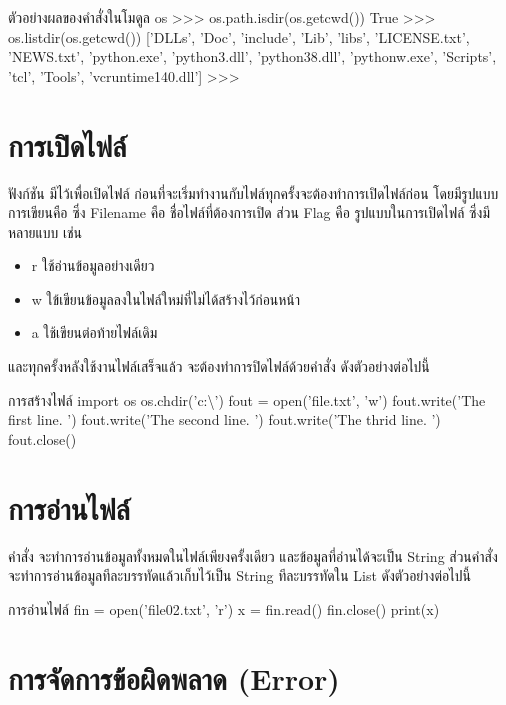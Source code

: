 \begin{codelist}{ตัวอย่างผลของคำสั่งในโมดูล os}{}
>>> os.path.isdir(os.getcwd())
True
>>> os.listdir(os.getcwd())
['DLLs', 'Doc', 'include', 'Lib', 'libs', 'LICENSE.txt', 'NEWS.txt', 
'python.exe', 'python3.dll', 'python38.dll', 'pythonw.exe', 
'Scripts', 'tcl', 'Tools', 'vcruntime140.dll']
>>>
\end{codelist}


\section{การเปิดไฟล์}

ฟังก์ชัน  มีไว้เพื่อเปิดไฟล์ ก่อนที่จะเริ่มทำงานกับไฟล์ทุกครั้งจะต้องทำการเปิดไฟล์ก่อน โดยมีรูปแบบการเขียนคือ  ซึ่ง Filename คือ ชื่อไฟล์ที่ต้องการเปิด ส่วน Flag คือ รูปแบบในการเปิดไฟล์ ซึ่งมีหลายแบบ เช่น 
\begin{itemize} 
\item 	r ใช้อ่านข้อมูลอย่างเดียว 
\item 	w ใข้เขียนข้อมูลลงในไฟล์ใหม่ที่ไม่ได้สร้างไว้ก่อนหน้า 
\item 	a ใช้เขียนต่อท้ายไฟล์เดิม 
\end{itemize}
และทุกครั้งหลังใช้งานไฟล์เสร็จแล้ว จะต้องทำการปิดไฟล์ด้วยคำสั่ง  ดังตัวอย่างต่อไปนี้

\begin{codelist}{การสร้างไฟล์}{}
import os
os.chdir('c:\textbackslash\Users\janta\Desktop')
fout = open('file.txt', 'w')
fout.write('The first line. \n')
fout.write('The second line. \n')
fout.write('The thrid line. \n')
fout.close()
\end{codelist}


\section{การอ่านไฟล์}

คำสั่ง  จะทำการอ่านข้อมูลทั้งหมดในไฟล์เพียงครั้งเดียว และข้อมูลที่อ่านได้จะเป็น String ส่วนคำสั่ง  จะทำการอ่านข้อมูลทีละบรรทัดแล้วเก็บไว้เป็น String ทีละบรรทัดใน List ดังตัวอย่างต่อไปนี้

\begin{codelist}{การอ่านไฟล์}{}
fin = open('file02.txt', 'r')
x = fin.read()
fin.close()
print(x)
\end{codelist}

\section{การจัดการข้อผิดพลาด (Error)}

